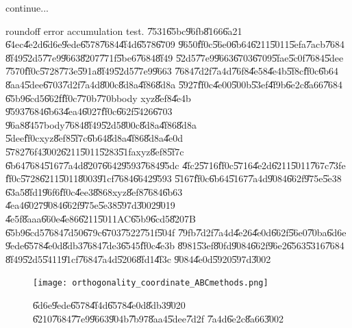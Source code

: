 continue...

\clearpage%

\begin{case}
roundoff error accumulation test. \U{7531}\U{65bc}\U{96fb}\U{8166}\U{6a21}%
\U{64ec}\U{4e2d}\U{6d6e}\U{9ede}\U{6578}\U{7684}\U{4f4d}\U{6578}\U{6709}%
\U{9650}\U{ff0c}\U{56e0}\U{6b64}\U{6211}\U{5011}\U{5efa}\U{7acb}\U{7684}%
\U{8f49}\U{52d5}\U{77e9}\U{9663}\U{8207}\U{771f}\U{5be6}\U{7684}\U{8f49}%
\U{52d5}\U{77e9}\U{9663}\U{6703}\U{6709}\U{5fae}\U{5c0f}\U{7684}\U{5dee}%
\U{7570}\U{ff0c}\U{5728}\U{773e}\U{591a}\U{8f49}\U{52d5}\U{77e9}\U{9663}%
\U{7684}\U{7d2f}\U{7a4d}\U{76f8}\U{4e58}\U{4e4b}\U{5f8c}\U{ff0c}\U{6b64}%
\U{8aa4}\U{5dee}\U{6703}\U{7d2f}\U{7a4d}\U{800c}\U{8d8a}\U{4f86}\U{8d8a}%
\U{5927}\U{ff0c}\U{4e00}\U{500b}\U{53ef}\U{4f9b}\U{6e2c}\U{8a66}\U{7684}%
\U{65b9}\U{6cd5}\U{662f}\U{ff0c}\U{770b}\U{770b}body xyz\U{8ef8}\U{4e4b}%
\U{9593}\U{7684}\U{6b63}\U{4ea4}\U{6027}\U{ff0c}\U{662f}\U{5426}\U{6703}%
\U{96a8}\U{8457}body\U{7684}\U{8f49}\U{52d5}\U{800c}\U{8d8a}\U{4f86}\U{8d8a}%
\U{5dee}\U{ff0c}xyz\U{8ef8}\U{5f7c}\U{6b64}\U{8d8a}\U{4f86}\U{8d8a}\U{4e0d}%
\U{5782}\U{76f4}\U{3002}\U{6211}\U{5011}\U{5283}\U{51fa}xyz\U{8ef8}\U{5f7c}%
\U{6b64}\U{7684}\U{5167}\U{7a4d}\U{8207}\U{6642}\U{9593}\U{7684}\U{95dc}%
\U{4fc2}\U{5716}\U{ff0c}\U{5716}\U{4e2d}\U{6211}\U{5011}\U{767c}\U{73fe}%
\U{ff0c}\U{5728}\U{6211}\U{5011}\U{8003}\U{91cf}\U{7684}\U{6642}\U{9593}%
\U{5167}\U{ff0c}\U{6b64}\U{5167}\U{7a4d}\U{9084}\U{662f}\U{975e}\U{5e38}%
\U{63a5}\U{8fd1}\U{96f6}\U{ff0c}\U{4ee3}\U{8868}xyz\U{8ef8}\U{7684}\U{6b63}%
\U{4ea4}\U{6027}\U{9084}\U{662f}\U{975e}\U{5e38}\U{597d}\U{3002}\U{9019}%
\U{4e5f}\U{8aaa}\U{660e}\U{4e86}\U{6211}\U{5011}AC\U{65b9}\U{6cd5}\U{8207}B%
\U{65b9}\U{6cd5}\U{7684}\U{7d50}\U{679c}\U{6703}\U{7522}\U{751f}\U{504f}%
\U{79fb}\U{7d2f}\U{7a4d}\U{4e26}\U{4e0d}\U{662f}\U{56e0}\U{70ba}\U{6d6e}%
\U{9ede}\U{6578}\U{4e0d}\U{8db3}\U{7684}\U{7de3}\U{6545}\U{ff0c}\U{4e3b}%
\U{8981}\U{53ef}\U{80fd}\U{9084}\U{662f}\U{96e2}\U{6563}\U{5316}\U{7684}%
\U{8f49}\U{52d5}\U{5411}\U{91cf}\U{7684}\U{7a4d}\U{5206}\U{8fd1}\U{4f3c}%
\U{9084}\U{4e0d}\U{5920}\U{597d}\U{3002}
\end{case}

\begin{figure}[th]
\caption{\U{6d6e}\U{9ede}\U{6578}\U{4f4d}\U{6578}\U{4e0d}\U{8db3}\U{9020}%
\U{6210}\U{7684}\U{77e9}\U{9663}\U{904b}\U{7b97}\U{8aa4}\U{5dee}\U{7d2f}%
\U{7a4d}\U{6e2c}\U{8a66}\U{3002}}
\begin{center}
\texttt{[image: orthogonality\_coordinate\_ABCmethods.png]}
\end{center}
\end{figure}

